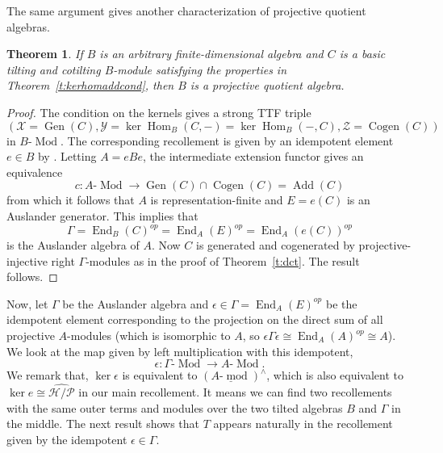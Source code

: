 \documentclass[11pt,a4paper]{amsart}
\theoremstyle{plain}
\newtheorem{thm}{Theorem}[section]
\theoremstyle{definition}
\begin{document}
The same argument gives another characterization of
projective quotient algebras.

\begin{thm}
If $B$ is an arbitrary finite-dimensional algebra
and $C$ is a basic tilting and cotilting $B$-module 
satisfying the properties in Theorem~\ref{t:kerhomaddcond},
then $B$ is a projective quotient algebra.
\end{thm}

\begin{proof}
The condition on the kernels gives a strong TTF triple 
\[
({\mathcal{X}} = \operatorname{Gen} (C) , {\mathcal{Y}} = \operatorname{ker} \operatorname{Hom}_B (C, - ) = \operatorname{ker} \operatorname{Hom}_B (-, C), {\mathcal{Z}} = \operatorname{Cogen} (C)) 
\]
in $B$-$\operatorname{Mod}$. 
The corresponding recollement is given by an idempotent element $e\in B$ by \cite[Corollary 5.5]{PV}. 
Letting $A = eBe$, the intermediate extension functor gives an equivalence 
\[ 
c\colon \text{$A$-$\operatorname{Mod}$} \to \operatorname{Gen} (C) \cap \operatorname{Cogen} (C) = \operatorname{Add} (C)
\]
from which it follows that $A$ is representation-finite and $E=e(C)$ is an Auslander generator. This implies that
\[ 
\Gamma = \operatorname{End}_B (C)^{op} = \operatorname{End}_A (E)^{op} =\operatorname{End}_A ( e(C))^{op}
\]
is the Auslander algebra of $A$.
Now $C$ is generated and cogenerated by projective-injective right $\Gamma$-modules as in the proof of Theorem~\ref{t:dct}. The result follows.  
\end{proof}

Now, let $\Gamma$ be the Auslander algebra and $\epsilon \in \Gamma = \operatorname{End}_A(E)^{op}$ 
be the idempotent element corresponding to the projection on the direct sum of all projective $A$-modules 
(which is isomorphic to $A$, so $\epsilon \Gamma \epsilon \cong \operatorname{End}_A(A)^{op} \cong A$). 
We look at the map given by left multiplication with this 
idempotent,
\[ 
\epsilon\colon \text{$\Gamma$-$\operatorname{Mod}$} \to \text{$A$-$\operatorname{Mod}$}. 
\]
We remark that, $\operatorname{ker} \epsilon $ is equivalent to 
$\left( \underline{\text{$A$-$\operatorname{mod}$}}\right)^{\wedge } $, which is also equivalent to 
$\operatorname{ker} {e} \cong {\widehat{\mathcal{H}/\mathcal{P}}  }$ in our main recollement. It means we can find two recollements with the same outer terms and modules over the two tilted algebras $B$ and $\Gamma$ in the middle. 
The next result shows that $T$ appears naturally in the recollement
given by the idempotent $\epsilon \in \Gamma$.
\end{document}
